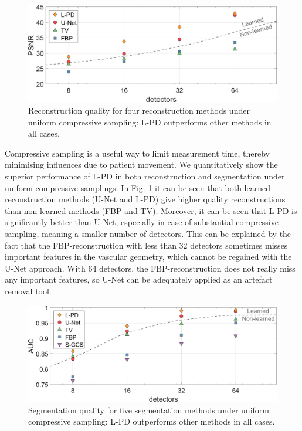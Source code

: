 \documentclass[journal]{IEEEtran}
\newcommand{\hl}[1]{\cbcolor{red}\begin{changebar}{#1}\end{changebar}}
\begin{document}
\begin{figure}[ht!]
\centering
\includegraphics[width=\linewidth]{images/Paper_resultsuniform_PSNR.png}
\caption{Reconstruction quality for four reconstruction methods under uniform compressive sampling: L-PD outperforms other methods in all cases.}
\label{fig:PSNR_recon}
\end{figure}

Compressive sampling is a useful way to limit measurement time, thereby minimising influences due to patient movement. We quantitatively show the superior performance of L-PD in both reconstruction and segmentation under uniform compressive samplings. In Fig. \ref{fig:PSNR_recon} it can be seen that both learned reconstruction methods (U-Net and L-PD) give higher quality reconstructions than non-learned methods (FBP and TV). Moreover, it can be seen that L-PD is significantly better than U-Net, especially in case of substantial compressive sampling, meaning a smaller number of detectors. This can be explained by the fact that the FBP-reconstruction with less than 32 detectors sometimes misses important features in the vascular geometry, which cannot be regained with the U-Net approach. With 64 detectors, the FBP-reconstruction does not really miss any important features, so U-Net can be adequately applied as an artefact removal tool.  

\hl{
\begin{figure}[ht!]
\centering
\includegraphics[width=\linewidth]{images/Paper_resultsuniform_AUC.png}
\caption{Segmentation quality for five segmentation methods under uniform compressive sampling: L-PD outperforms other methods in all cases.}
\label{fig:AUC_recon}
\end{figure}
}
\end{document}

